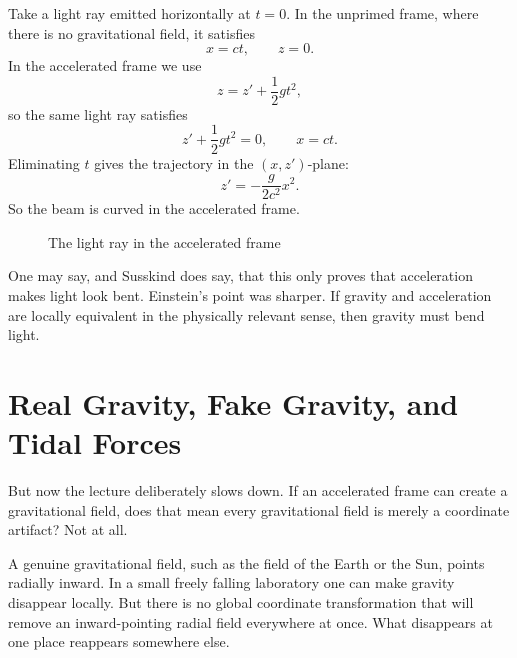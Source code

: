 Take a light ray emitted horizontally at \(t=0\).  In the unprimed frame, where there is no gravitational field, it satisfies
\begin{equation}
x=ct, \qquad z=0.
\end{equation}
In the accelerated frame we use
\begin{equation}
z = z' + \frac{1}{2}gt^2,
\end{equation}
so the same light ray satisfies
\begin{equation}
z' + \frac{1}{2}gt^2 = 0, \qquad x=ct.
\end{equation}
Eliminating \(t\) gives the trajectory in the \((x,z')\)-plane:
\begin{equation}
z' = -\frac{g}{2c^2}x^2.
\end{equation}
So the beam is curved in the accelerated frame.

\begin{figure}[htbp]
\centering
{}
\caption{The light ray in the accelerated frame}
\end{figure}

One may say, and Susskind does say, that this only proves that acceleration makes light look bent.  Einstein's point was sharper.  If gravity and acceleration are locally equivalent in the physically relevant sense, then gravity must bend light.

\section{Real Gravity, Fake Gravity, and Tidal Forces}

But now the lecture deliberately slows down.  If an accelerated frame can create a gravitational field, does that mean every gravitational field is merely a coordinate artifact?  Not at all.

A genuine gravitational field, such as the field of the Earth or the Sun, points radially inward.  In a small freely falling laboratory one can make gravity disappear locally.  But there is no global coordinate transformation that will remove an inward-pointing radial field everywhere at once.  What disappears at one place reappears somewhere else.

